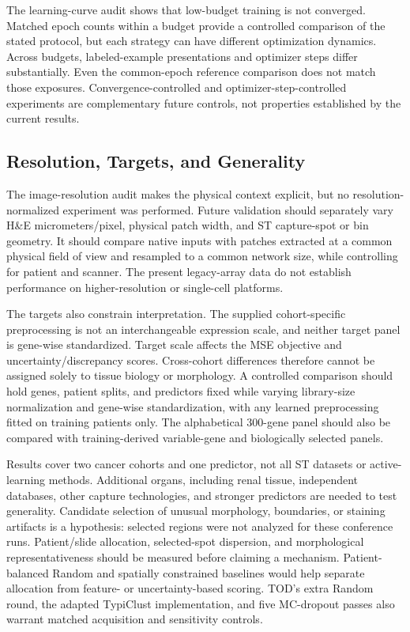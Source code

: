 \documentclass[]{spie}
\begin{document}
The learning-curve audit shows that low-budget training is not converged. Matched epoch counts within a budget provide a controlled comparison of the stated protocol, but each strategy can have different optimization dynamics. Across budgets, labeled-example presentations and optimizer steps differ substantially. Even the common-epoch reference comparison does not match those exposures. Convergence-controlled and optimizer-step-controlled experiments are complementary future controls, not properties established by the current results.

\subsection{Resolution, Targets, and Generality}

The image-resolution audit makes the physical context explicit, but no resolution-normalized experiment was performed. Future validation should separately vary H\&E micrometers/pixel, physical patch width, and ST capture-spot or bin geometry. It should compare native inputs with patches extracted at a common physical field of view and resampled to a common network size, while controlling for patient and scanner. The present legacy-array data do not establish performance on higher-resolution or single-cell platforms.

The targets also constrain interpretation. The supplied cohort-specific preprocessing is not an interchangeable expression scale, and neither target panel is gene-wise standardized. Target scale affects the MSE objective and uncertainty/discrepancy scores. Cross-cohort differences therefore cannot be assigned solely to tissue biology or morphology. A controlled comparison should hold genes, patient splits, and predictors fixed while varying library-size normalization and gene-wise standardization, with any learned preprocessing fitted on training patients only. The alphabetical 300-gene panel should also be compared with training-derived variable-gene and biologically selected panels.

Results cover two cancer cohorts and one predictor, not all ST datasets or active-learning methods. Additional organs, including renal tissue, independent databases, other capture technologies, and stronger predictors are needed to test generality. Candidate selection of unusual morphology, boundaries, or staining artifacts is a hypothesis: selected regions were not analyzed for these conference runs. Patient/slide allocation, selected-spot dispersion, and morphological representativeness should be measured before claiming a mechanism. Patient-balanced Random and spatially constrained baselines would help separate allocation from feature- or uncertainty-based scoring. TOD's extra Random round, the adapted TypiClust implementation, and five MC-dropout passes also warrant matched acquisition and sensitivity controls.
\end{document}
